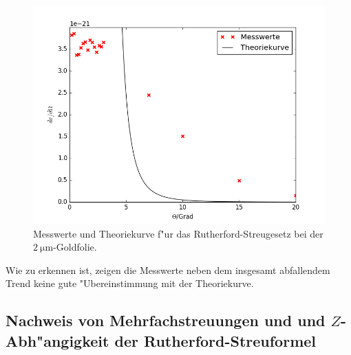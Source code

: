  \begin{figure}
    \centering
    \includegraphics[width=15cm]{skripte/ruther.png}
    \caption{Messwerte und Theoriekurve f"ur das Rutherford-Streugesetz bei der $\SI{2}{\micro \meter}$-Goldfolie.}
    \label{plot:ruther}
  \end{figure}

  Wie zu erkennen ist, zeigen die Messwerte neben dem insgesamt abfallendem Trend keine gute "Ubereinstimmung mit der Theoriekurve.





  \subsection{Nachweis von Mehrfachstreuungen und und $Z$-Abh"angigkeit der Rutherford-Streuformel}
